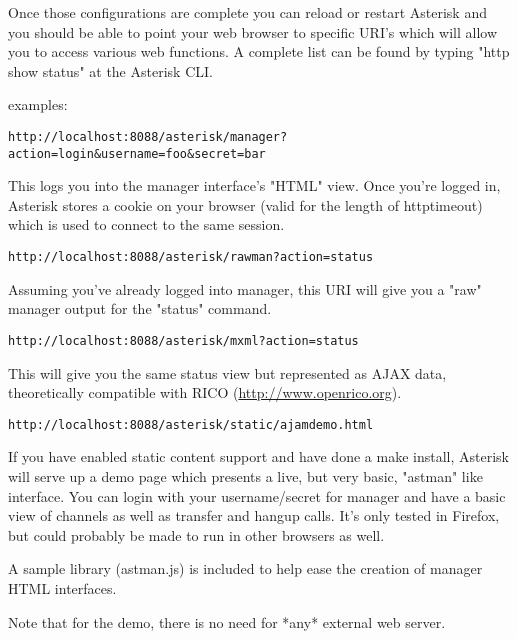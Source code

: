 Once those configurations are complete you can reload or restart
Asterisk and you should be able to point your web browser to specific
URI's which will allow you to access various web functions.  A complete
list can be found by typing "http show status" at the Asterisk CLI.

examples:
\begin{astlisting}
\begin{verbatim}
http://localhost:8088/asterisk/manager?action=login&username=foo&secret=bar
\end{verbatim}
\end{astlisting}
This logs you into the manager interface's "HTML" view.  Once you're
logged in, Asterisk stores a cookie on your browser (valid for the
length of httptimeout) which is used to connect to the same session.
\begin{astlisting}
\begin{verbatim}
http://localhost:8088/asterisk/rawman?action=status
\end{verbatim}
\end{astlisting}
Assuming you've already logged into manager, this URI will give you a
"raw" manager output for the "status" command.
\begin{astlisting}
\begin{verbatim}
http://localhost:8088/asterisk/mxml?action=status
\end{verbatim}
\end{astlisting}
This will give you the same status view but represented as AJAX data,
theoretically compatible with RICO (\url{http://www.openrico.org}).
\begin{astlisting}
\begin{verbatim}
http://localhost:8088/asterisk/static/ajamdemo.html
\end{verbatim}
\end{astlisting}
If you have enabled static content support and have done a make install,
Asterisk will serve up a demo page which presents a live, but very
basic, "astman" like interface.  You can login with your username/secret
for manager and have a basic view of channels as well as transfer and
hangup calls.  It's only tested in Firefox, but could probably be made
to run in other browsers as well.

A sample library (astman.js) is included to help ease the creation of
manager HTML interfaces.

Note that for the demo, there is no need for *any* external web server.

